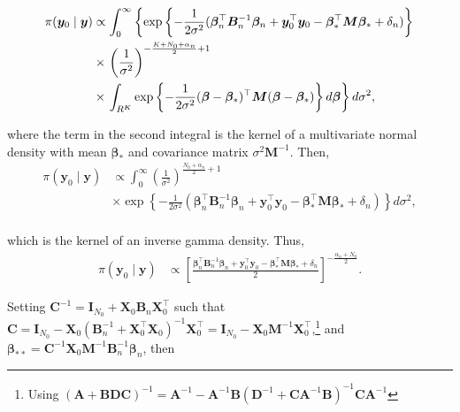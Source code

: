 \begin{align*}
	\allowdisplaybreaks
	\pi({\bm{y}}_0\mid {\bm{y}})&\propto\int_{0}^{\infty}\left\{\exp\left\{-\frac{1}{2\sigma^2}(\bm{\beta}_n^{\top}{\bm{B}}_n^{-1}\bm{\beta}_n+{\bm{y}}_0^{\top}{\bm{y}}_0-\bm{\beta}_*^{\top}{\bm{M}}\bm{\beta}_*+\delta_n)\right\}\right.\\
	&\times\left.\left(\frac{1}{\sigma^2}\right)^{-\frac{K+N_0+\alpha_n}{2}+1}\right.\\
	&\times\left.\int_{R^K}\exp\left\{-\frac{1}{2\sigma^2}(\bm{\beta} - \bm{\beta}_*)^{\top}{\bm{M}}(\bm{\beta} - \bm{\beta}_*)\right\}d\bm{\beta}\right\} d\sigma^2,\\
\end{align*}

where the term in the second integral is the kernel of a multivariate normal density with mean $\bm{\beta}_*$ and covariance matrix $\sigma^2{\bm{M}}^{-1}$. Then,
\begin{align*}
	\pi({\bm{y}}_0\mid {\bm{y}})&\propto\int_{0}^{\infty}\left(\frac{1}{\sigma^2}\right)^{\frac{N_0+\alpha_n}{2}+1}\\
	&\times\exp\left\{-\frac{1}{2\sigma^2}(\bm{\beta}_n^{\top}{\bm{B}}_n^{-1}\bm{\beta}_n+{\bm{y}}_0^{\top}{\bm{y}}_0-\bm{\beta}_*^{\top}{\bm{M}}\bm{\beta}_*+\delta_n)\right\}d\sigma^2,\\
\end{align*}


which is the kernel of an inverse gamma density. Thus,
\begin{align*}
	\pi({\bm{y}}_0\mid {\bm{y}})&\propto \left[\frac{\bm{\beta}_n^{\top}{\bm{B}}_n^{-1}\bm{\beta}_n+{\bm{y}}_0^{\top}{\bm{y}}_0-\bm{\beta}_*^{\top}{\bm{M}}\bm{\beta}_*+\delta_n}{2}\right]^{-\frac{\alpha_n+N_0}{2}}.
\end{align*}

Setting ${\bm{C}}^{-1}={\bm{I}}_{N_0}+{\bm{X}}_0{\bm{B}}_n{\bm{X}}_0^{\top}$ such that ${\bm{C}}={\bm{I}}_{N_0}-{\bm{X}}_0({\bm{B}}_n^{-1}+{\bm{X}}_0^{\top}{\bm{X}}_0)^{-1}{\bm{X}}_0^{\top}={\bm{I}}_{N_0}-{\bm{X}}_0{\bm{M}}^{-1}{\bm{X}}_0^{\top}$,\footnote{Using $({\bm{A}}+{\bm{B}}{\bm{D}}{\bm{C}})^{-1}={\bm{A}}^{-1}-{\bm{A}}^{-1}{\bm{B}}({\bm{D}}^{-1}+{\bm{C}}{\bm{A}}^{-1}{\bm{B}})^{-1}{\bm{C}}{\bm{A}}^{-1}$} and ${\bm{\bm{\beta}}}_{**}={\bm{C}}^{-1}{\bm{X}}_0{\bm{M}}^{-1}{\bm{B}}_n^{-1}\bm{\beta}_n$, then 


